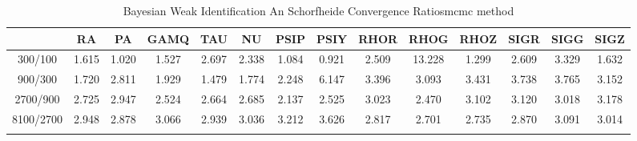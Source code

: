 \documentclass[a4paper,10pt]{article}
\begin{document}
\centering
\begin{longtable}{cccccccccccccc}
\toprule
 & RA & PA & GAMQ & TAU & NU & PSIP & PSIY & RHOR & RHOG & RHOZ & SIGR & SIGG & SIGZ \\
\midrule
300/100 & 1.615 & 1.020 & 1.527 & 2.697 & 2.338 & 1.084 & 0.921 & 2.509 & 13.228 & 1.299 & 2.609 & 3.329 & 1.632 \\
900/300 & 1.720 & 2.811 & 1.929 & 1.479 & 1.774 & 2.248 & 6.147 & 3.396 & 3.093 & 3.431 & 3.738 & 3.765 & 3.152 \\
2700/900 & 2.725 & 2.947 & 2.524 & 2.664 & 2.685 & 2.137 & 2.525 & 3.023 & 2.470 & 3.102 & 3.120 & 3.018 & 3.178 \\
8100/2700 & 2.948 & 2.878 & 3.066 & 2.939 & 3.036 & 3.212 & 3.626 & 2.817 & 2.701 & 2.735 & 2.870 & 3.091 & 3.014 \\
\bottomrule
\caption{Bayesian Weak Identification An Schorfheide Convergence Ratiosmcmc method}
\label{table:tbl:WeakAnSchoConvergenceRatios_mcmc}
\end{longtable}
\end{document}

